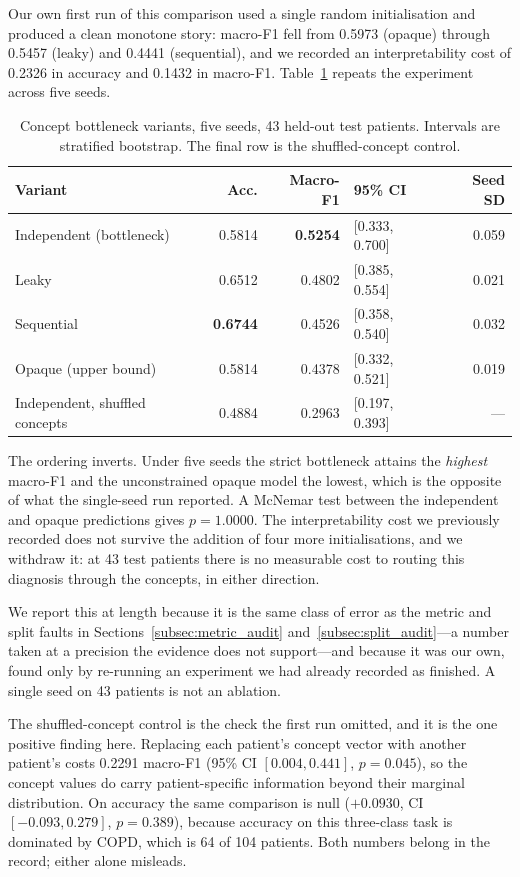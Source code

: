 \documentclass[journal,onecolumn]{IEEEtran}
\newcommand{\best}[1]{\textbf{#1}}
\begin{document}
Our own first run of this comparison used a single random initialisation and produced a
clean monotone story: macro-F1 fell from 0.5973 (opaque) through 0.5457 (leaky) and
0.4441 (sequential), and we recorded an interpretability cost of 0.2326 in accuracy and
0.1432 in macro-F1. Table~\ref{tab:bottleneck} repeats the experiment across five
seeds.

\begin{table}[!t]
\centering
\caption{Concept bottleneck variants, five seeds, 43 held-out test patients.
Intervals are stratified bootstrap. The final row is the shuffled-concept control.}
\label{tab:bottleneck}
\begin{tabular}{lrrlr}
\toprule
Variant & Acc. & Macro-F1 & 95\% CI & Seed SD \\
\midrule
Independent (bottleneck) & 0.5814 & \best{0.5254} & [0.333, 0.700] & 0.059 \\
Leaky                    & 0.6512 & 0.4802 & [0.385, 0.554] & 0.021 \\
Sequential               & \best{0.6744} & 0.4526 & [0.358, 0.540] & 0.032 \\
Opaque (upper bound)     & 0.5814 & 0.4378 & [0.332, 0.521] & 0.019 \\
\midrule
Independent, shuffled concepts & 0.4884 & 0.2963 & [0.197, 0.393] & --- \\
\bottomrule
\end{tabular}
\end{table}

The ordering inverts. Under five seeds the strict bottleneck attains the \emph{highest}
macro-F1 and the unconstrained opaque model the lowest, which is the opposite of what
the single-seed run reported. A McNemar test between the independent and opaque
predictions gives $p=1.0000$. The interpretability cost we previously recorded does not
survive the addition of four more initialisations, and we withdraw it: at 43 test
patients there is no measurable cost to routing this diagnosis through the concepts, in
either direction.

We report this at length because it is the same class of error as the metric and split
faults in Sections~\ref{subsec:metric_audit} and~\ref{subsec:split_audit}---a number
taken at a precision the evidence does not support---and because it was our own, found
only by re-running an experiment we had already recorded as finished. A single seed on
43 patients is not an ablation.

The shuffled-concept control is the check the first run omitted, and it is the one
positive finding here. Replacing each patient's concept vector with another patient's
costs 0.2291 macro-F1 (95\% CI $[0.004, 0.441]$, $p=0.045$), so the concept values do
carry patient-specific information beyond their marginal distribution. On accuracy the
same comparison is null ($+0.0930$, CI $[-0.093, 0.279]$, $p=0.389$), because accuracy
on this three-class task is dominated by COPD, which is 64 of 104 patients. Both
numbers belong in the record; either alone misleads.
\end{document}
